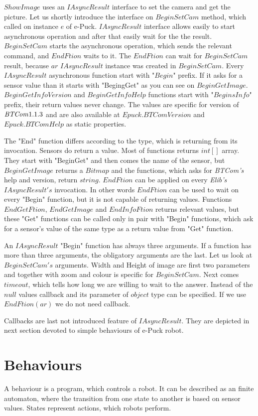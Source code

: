 \documentclass[12pt,notitlepage]{report}
\begin{document}
	$ShowImage$ uses an $IAsyncResult$ interface to set the camera and get the picture.
	Let us shortly introduce the interface on $BeginSetCam$ method, which called on instance $e$ of e-Puck.
	$IAsyncResult$ interface allows easily to start asynchronous operation and after that easily wait for the the result.
	$BeginSetCam$ starts the asynchronous operation, which sends the relevant command, and $EndFtion$ waits to it.
	The $EndFtion$ can wait for $BeginSetCam$ result, because $ar$ $IAsyncResult$ instance was created in $BeginSetCam$.
	Every $IAsyncResult$ asynchronous function start with "$Begin$" prefix. 
	If it asks for a sensor value than it starts with "BegingGet" as you can see on $BeginGetImage$.
	$BeginGetInfoVersion$ and $BeginGetInfoHelp$ functions start with "$BeginsInfo$" prefix, their return values never change. 
	The values are specific for version of ${\it BTCom} 1.1.3$ and
	are also available at $Epuck.BTComVersion$ and $Epuck.BTComHelp$ as static properties.

	The "End" function differs according to the type, which is returning from its invocation.
	Sensors do  return a value. Most of functions returns $int[]$ array. They start with "BeginGet" 
	and then comes the name of the sensor, 	but $BeginGetImage$ returns a $Bitmap$ and the functions,
	which asks for {\it BTCom's} help and version, return $string$.
	$EndFtion$ can be applied on every {\it Elib's} $IAsyncResult's$ invocation. 
	In other words $EndFtion$ can be used to wait on every "Begin" function, but
	it is not capable of returning values. Functions $EndGetFtion$, $EndGetImage$ and $EndInfoFtion$ returns relevant values, but
	these "Get" functions can be called only in pair with "Begin" functions, which ask for a sensor's value 
	of the same type as a return value from "Get" function.

	An $IAsyncResult$ "Begin" function has always three arguments. If a function has more than three arguments, the obligatory arguments are the last.
	Let us look at $BeginSetCam's$ arguments. Width and Height of image are first two parameters 
	and together with zoom and colour is specific for $BeginSetCam$.
	Next comes $timeout$, which tells how long we are willing to wait to the answer. 
	Instead of the $null$ values callback and its parameter of $object$ type can be specified.
	If we use $EndFtion(ar)$ we do not need callback.

	Callbacks are last not introduced feature of $IAsyncResult$. They are depicted in next section devoted to simple behaviours of e-Puck robot.
\section{Behaviours} \label{behaviours}
	A behaviour is a program, which controls a robot. It can be described as an finite automaton, 
	where the transition from one state to another is based on sensor values.
	States represent actions, which robots perform.
	
\end{document}
